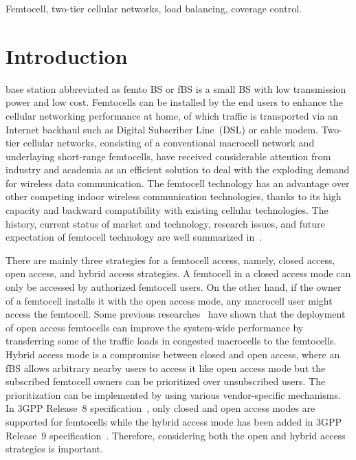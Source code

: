 \documentclass[journal]{IEEEtran}
\begin{document}
\begin{IEEEkeywords}
Femtocell, two-tier cellular networks, load balancing, coverage control.
\end{IEEEkeywords}




\section{Introduction}
\label{sec:intro}

 base station
abbreviated as femto BS or fBS
is a small BS  with low transmission power and low cost.
Femtocells can be installed by the end users to enhance the cellular networking performance at home,
of which traffic is transported via an Internet backhaul such as Digital Subscriber Line~(DSL) or cable modem.
Two-tier cellular networks, consisting of a conventional macrocell network
and underlaying short-range femtocells,
have received considerable attention from industry and academia as an efficient solution
to deal with the exploding demand for wireless data communication.
The femtocell technology has an advantage over other competing indoor wireless communication
technologies, thanks to its high capacity and backward compatibility with existing cellular technologies.
The history, current status of market and technology,
research issues, and future expectation of femtocell technology
are well summarized in~\cite{jsac12andrews}.


There are mainly three strategies for a femtocell access, namely,
closed access, open access, and hybrid access strategies.
A femtocell in a closed access mode can only be accessed by
authorized femtocell users.
On the other hand, if the owner of a femtocell installs it with the
open access mode, any macrocell user might access the
femtocell. Some previous researches~\cite{iccs09lopez,globecom10xia,icc11jo}
have shown that the deployment of open access femtocells can improve the system-wide performance by transferring some of the traffic loads in congested macrocells to the femtocells.
Hybrid access mode is a compromise between closed and open access, where
an fBS allows arbitrary nearby users to
access it like open access mode but the subscribed femtocell owners can be prioritized over
unsubscribed users. The prioritization can be implemented by using  various
vendor-specific mechanisms.
In 3GPP Release~8 specification~\cite{3gppTS36.3.8},
only closed and open access modes are supported for femtocells
while the hybrid access mode has been added in 3GPP Release~9 specification~\cite{3gppTS36.3.9}.
Therefore, considering both the open and hybrid access strategies is important.
\end{document}

